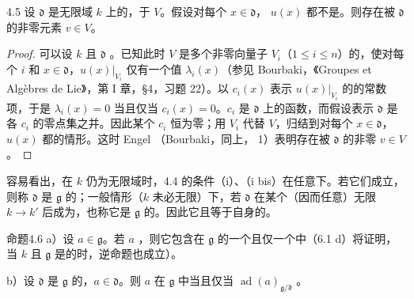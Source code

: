 \begin{SGAresult}{}{4.5}
设 $\mathfrak d$ 是无限域 $k$ 上的，于 $V$。假设对每个 $x\in\mathfrak d$， $u(x)$ 都不是。则存在被 $\mathfrak d$ 的非零元素 $v\in V$。
\end{SGAresult}
\begin{proof}
可以设 $k$ 且 $\mathfrak d$ 。已知此时 $V$ 是多个非零向量子 $V_i$（$1\leq i\leq n$）的，使对每个 $i$ 和 $x\in\mathfrak d$，$u(x)|_{V_i}$ 仅有一个值 $\lambda_i(x)$（参见 Bourbaki，《Groupes et Algèbres de Lie》，第 I 章，\S 4，习题 22）。以 $c_i(x)$ 表示 $u(x)|_{V_i}$ 的的常数项，于是 $\lambda_i(x)=0$ 当且仅当 $c_i(x)=0$。$c_i$ 是 $\mathfrak d$ 上的函数，而假设表示 $\mathfrak d$ 是各 $c_i$ 的零点集之并。因此某个 $c_i$ 恒为零；用 $V_i$ 代替 $V$，归结到对每个 $x\in\mathfrak d$，$u(x)$ 都的情形。这时 Engel （Bourbaki，同上， 1）表明存在被 $\mathfrak d$ 的非零 $v\in V$。
\end{proof}
容易看出，在 $k$ 仍为无限域时，4.4 的条件（i）、（i bis）在任意下。若它们成立，则称 $\mathfrak d$ 是 $\mathfrak g$ 的；一般情形（$k$ 未必无限）下，若 $\mathfrak d$ 在某个（因而任意）无限 $k\to k'$ 后成为，也称它是 $\mathfrak g$ 的。因此它且等于自身的。
\begin{SGAresult}{命题}{4.6}
 a）设 $a\in\mathfrak g$。若 $a$ ，则它包含在 $\mathfrak g$ 的一个且仅一个中（6.1 d）将证明，当 $k$ 且 $\mathfrak g$ 是的时，逆命题也成立）。

 b）设 $\mathfrak d$ 是 $\mathfrak g$ 的，$a\in\mathfrak d$。则 $a$ 在 $\mathfrak g$ 中当且仅当 $\operatorname{ad}(a)_{\mathfrak g/\mathfrak d}$ 。
\end{SGAresult}
